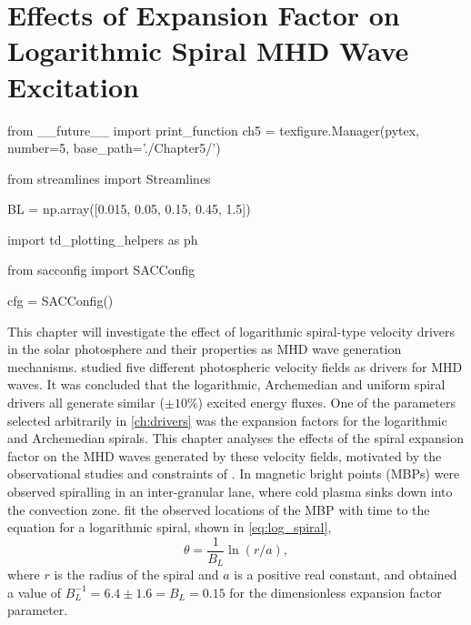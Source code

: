 
\chapter{Effects of Expansion Factor on Logarithmic Spiral MHD Wave Excitation}\label{ch:expfac}

\begin{pycode}[chapter5]
from __future__ import print_function
ch5 = texfigure.Manager(pytex, number=5, base_path='./Chapter5/')

from streamlines import Streamlines

BL = np.array([0.015, 0.05, 0.15, 0.45, 1.5])

import td_plotting_helpers as ph

from sacconfig import SACConfig

cfg = SACConfig()
\end{pycode}

This chapter will investigate the effect of logarithmic spiral-type velocity drivers in the solar photosphere and their properties as MHD wave generation mechanisms.
 studied five different photospheric velocity fields as drivers for MHD waves.
It was concluded that the logarithmic, Archemedian and uniform spiral drivers all generate similar ($\pm 10\%$) excited energy fluxes.
One of the parameters selected arbitrarily in \cref{ch:drivers} was the expansion factors for the logarithmic and Archemedian spirals.
This chapter analyses the effects of the spiral expansion factor on the MHD waves generated by these velocity fields, motivated by the observational studies and constraints of \cite{bonet2008}.
In \cite{bonet2008} magnetic bright points (MBPs) were observed spiralling in an inter-granular lane, where cold plasma sinks down into the convection zone.
\cite{bonet2008} fit the observed locations of the MBP with time to the equation for a logarithmic spiral, shown in \cref{eq:log_spiral},
\begin{equation}
\theta = \frac{1}{B_L}\ln(r/a),
\label{eq:log_spiral}
\end{equation}
where $r$ is the radius of the spiral and $a$ is a positive real constant, and obtained a value of $B_L^{-1} = 6.4 \pm 1.6 = B_L = 0.15$ for the dimensionless expansion factor parameter.

